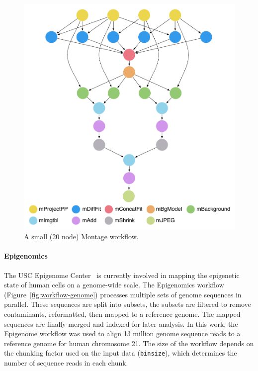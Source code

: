 \begin{figure}[!htt]
	\centering
	\includegraphics[width=0.9\linewidth]{figures/workflow-montage}
	\caption{A small (20 node) Montage workflow.}
	\label{fig:workflow-montage}
\end{figure}


\paragraph{\textbf{Epigenomics}}
The USC Epigenome Center~\cite{genome} is currently involved in mapping the epigenetic 
state of human cells on a genome-wide scale. The Epigenomics workflow 
(Figure~\ref{fig:workflow-genome}) processes multiple sets of genome sequences in
parallel. These sequences are split into subsets, the subsets are filtered to remove
contaminants, reformatted, then mapped to a reference genome. The mapped sequences are
finally merged and indexed for later analysis. In this work, the Epigenome workflow was 
used to align 13 million genome sequence reads to a reference genome for human 
chromosome 21. The size of the workflow depends on the chunking factor used on the input 
data (\texttt{binsize}), which determines the number of sequence reads in each chunk.

